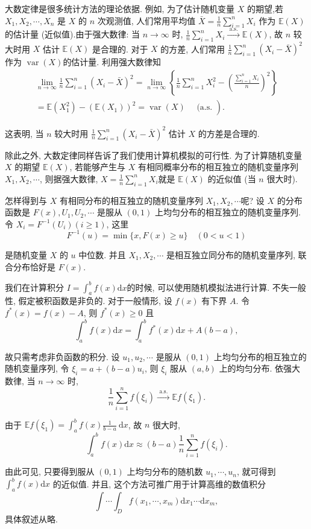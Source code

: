 大数定律是很多统计方法的理论依据. 例如, 为了估计随机变量 $X$ 的期望,若 $X_1, X_2, \cdots, X_n$ 是 $X$ 的 $n$ 次观测值, 人们常用平均值 $\bar{X}=\frac{1}{n} \sum_{i=1}^n X_i$ 作为 $\mathbb{E}(X)$ 的估计量 (近似值).由于强大数律: 当 $n \rightarrow \infty$ 时, $\frac{1}{n} \sum_{i=1}^n X_i \stackrel{\text { a.s. }}{\longrightarrow} \mathbb{E}(X)$, 故 $n$ 较大时用 $X$ 估计 $\mathbb{E}(X)$ 是合理的. 对于 $X$ 的方差, 人们常用 $\frac{1}{n} \sum_{i=1}^n\left(X_i-\bar{X}\right)^2$ 作为 $\operatorname{var}(X)$的估计量. 利用强大数律知
$$
\begin{gathered}
\lim _{n \rightarrow \infty} \frac{1}{n} \sum_{i=1}^n\left(X_i-\bar{X}\right)^2=\lim _{n \rightarrow \infty}\left\{\frac{1}{n} \sum_{i=1}^n X_i^2-\left(\frac{\sum_{i=1}^n X_i}{n}\right)^2\right\} \\
\left.=\mathbb{E}\left(X_1^2\right)-\left(\mathbb{E}\left(X_1\right)\right)^2=\operatorname{var}(X) \quad \text { (a.s. }\right) .
\end{gathered}
$$

这表明, 当 $n$ 较大时用 $\frac{1}{n} \sum_{i=1}^n\left(X_i-\bar{X}\right)^2$ 估计 $X$ 的方差是合理的.

除此之外, 大数定律同样告诉了我们使用计算机模拟的可行性. 为了计算随机变量 $X$ 的期望 $\mathbb{E}(X)$, 若能够产生与 $X$ 有相同概率分布的相互独立的随机变量序列 $X_1, X_2, \cdots$, 则据强大数律, $X=\frac{1}{n} \sum_{i=1}^n X_i$就是 $\mathbb{E}(X)$ 的近似值 (当 $n$ 很大时).

怎样得到与 $X$ 有相同分布的相互独立的随机变量序列 $X_1, X_2, \cdots$呢? 设 $X$ 的分布函数是 $F(x), U_1, U_2, \cdots$ 是服从 $(0,1)$ 上均匀分布的相互独立的随机变量序列. 令 $X_i=F^{-1}\left(U_i\right)(i \geq 1)$, 这里
$$
F^{-1}(u)=\min \{x, F(x) \geq u\} \quad(0<u<1)
$$

是随机变量 $X$ 的 $u$ 中位数. 并且 $X_1, X_2, \cdots$ 是相互独立同分布的随机变量序列, 联合分布恰好是 $F(x)$.

\begin{example}
    我们在计算积分 $I=\int_a^b f(x) \mathrm{d} x$的时候, 可以使用随机模拟法进行计算. 不失一般性, 假定被积函数是非负的. 对于一般情形, 设 $f(x)$ 有下界 $A$. 令 $f^*(x)=f(x)-A$, 则 $f^*(x) \geq 0$ 且
    $$
    \int_a^b f(x) \mathrm{d} x=\int_a^b f^*(x) \mathrm{d} x+A(b-a),
    $$
    
    故只需考虑非负函数的积分. 设 $u_1, u_2, \cdots$ 是服从 $(0,1)$ 上均匀分布的相互独立的随机变量序列, 令 $\xi_i=a+(b-a) u_i$, 则 $\xi_i$ 服从 $(a, b)$ 上的均匀分布. 依强大数律, 当 $n \rightarrow \infty$ 时,
    $$
    \frac{1}{n} \sum_{i=1}^n f\left(\xi_i\right) \stackrel{\text { a.s. }}{\longrightarrow} \mathbb{E} f\left(\xi_1\right) .
    $$
    
    由于 $\mathbb{E} f\left(\xi_1\right)=\int_a^b f(x) \frac{1}{b-a} \mathrm{~d} x$, 故 $n$ 很大时,
    $$
    \int_a^b f(x) \mathrm{d} x \approx(b-a) \frac{1}{n} \sum_{i=1}^n f\left(\xi_i\right) .
    $$
    
    由此可见, 只要得到服从 $(0,1)$ 上均匀分布的随机数 $u_1, \cdots, u_n$, 就可得到 $\int_a^b f(x) \mathrm{d} x$ 的近似值.
    并且, 这个方法可推广用于计算高维的数值积分
    $$
    \int \cdots \int_D f\left(x_1, \cdots, x_m\right) \mathrm{d} x_1 \cdots \mathrm{d} x_m,
    $$
    具体叙述从略.
\end{example}